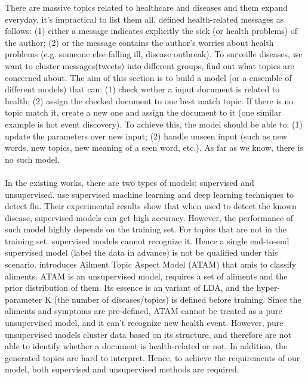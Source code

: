 \label{sec:uncovering}
There are massive topics related to healthcare and diseases and them expand everyday, it's impractical to list them all. \cite{tuarob2013discovering} defined health-related messages as follows: (1) either a message indicates explicitly the sick (or health problems) of the author; (2) or the message contains the author's worries about health problems (e.g. someone else falling ill, disease outbreak). To surveille diseases, we want to cluster messages(tweets) into different groups, find out what topics are concerned about. The aim of this section is to build a model (or a ensemble of different models) that can: (1) check wether a input document is related to health; (2) assign the checked document to one best match topic. If there is no topic match it, create a new one and assign the document to it (one similar example is hot event discovery). To achieve this, the model should be able to: (1) update the parameters over new input; (2) handle unseen input (such as new words, new topics, new meaning of a seen word, etc.). As far as we know, there is no such model.
\\\\
In the existing works, there are two types of models: supervised and unsupervised. \cite{serban2019real,aramaki2011twitter,lampos2010flu,chen2017disease} use supervised machine learning and deep learning techniques to detect flu. Their experimental results show that when used to detect the known disease, supervised models can get high accuracy. However, the performance of such model highly depends on the training set. For topics that are not in the training set, supervised models cannot recognize it. 
Hence a single end-to-end supervised model (label the data in advance) is not be qualified under this scenario. \cite{paul2012model} introduces Ailment Topic Aspect Model (ATAM) that amis to classify aliments. ATAM is an unsupervised model, requires a set of aliments and the prior distribution of them. Its essence is an variant of LDA, and the hyper-parameter K (the number of diseases/topics) is defined before training. Since the aliments and symptoms are pre-defined, ATAM cannot be treated as a pure unsupervised model, and it can't recognize new health event. However, pure unsupervised models cluster data based on its structure, and therefore are not able to identify whether a document is health-related or not. In addition, the generated topics are hard to interpret. Hence, to achieve the requirements of our model, both supervised and unsupervised methods are required.
\\\\
